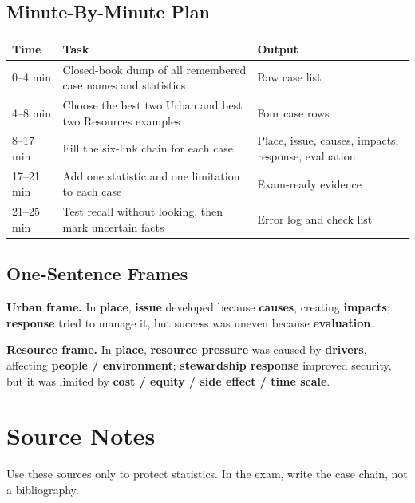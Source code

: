 \documentclass[11pt,a4paper]{article}
\newcommand{\term}[1]{\textcolor{HeadingBlue}{\textbf{#1}}}
\newcommand{\boxnote}[3]{%
\noindent\colorbox{#1}{%
  \begin{minipage}{0.965\textwidth}
  \sffamily
  \textbf{\textcolor{HeadingBlue}{#2}} #3
  \end{minipage}
}}
\begin{document}
\subsection{Minute-By-Minute Plan}

\begin{tabularx}{\textwidth}{L{0.15\textwidth}Y Y}
\toprule
\textbf{Time} & \textbf{Task} & \textbf{Output} \\
--4 min & Closed-book dump of all remembered case names and statistics & Raw
case list \\
4--8 min & Choose the best two Urban and best two Resources examples & Four
case rows \\
8--17 min & Fill the six-link chain for each case & Place, issue, causes,
impacts, response, evaluation \\
17--21 min & Add one statistic and one limitation to each case & Exam-ready
evidence \\
21--25 min & Test recall without looking, then mark uncertain facts & Error
log and check list \\
\bottomrule
\end{tabularx}

\subsection{One-Sentence Frames}

\boxnote{SoftGreen}{Urban frame.}{In \term{place}, \term{issue} developed
because \term{causes}, creating \term{impacts}; \term{response} tried to
manage it, but success was uneven because \term{evaluation}.}

\vspace{0.45em}

\boxnote{SoftBlue}{Resource frame.}{In \term{place}, \term{resource pressure}
was caused by \term{drivers}, affecting \term{people / environment};
\term{stewardship response} improved security, but it was limited by
\term{cost / equity / side effect / time scale}.}

\section{Source Notes}

Use these sources only to protect statistics. In the exam, write the case
chain, not a bibliography.
\end{document}
